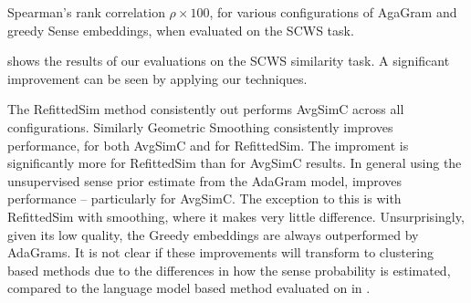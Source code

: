 \documentclass{sig-alternate}
\begin{document}
\begin{table}
	\begin{adjustbox}{max width=\columnwidth}
	\end{adjustbox}

\caption{Spearman's rank correlation $\rho \times 100$, for various configurations of AgaGram and greedy Sense embeddings, when evaluated on the SCWS task.} \label{swscres}
\end{table}

 shows the results of our evaluations on the SCWS similarity task. A significant improvement can be seen by applying our techniques.

The RefittedSim method consistently out performs AvgSimC across all configurations.
Similarly Geometric Smoothing consistently improves performance, for both AvgSimC and for RefittedSim. The improment is significantly more for RefittedSim than for AvgSimC results.
In general using the unsupervised sense prior estimate from the AdaGram model, improves performance -- particularly for AvgSimC. The exception to this is with RefittedSim with smoothing, where it makes very little difference. 
Unsurprisingly, given its low quality, the Greedy embeddings are always outperformed by AdaGrams.
It is not clear if these improvements will transform to clustering based methods due to the differences in how the sense probability is estimated, compared to the language model based method evaluated on in .
\end{document}
